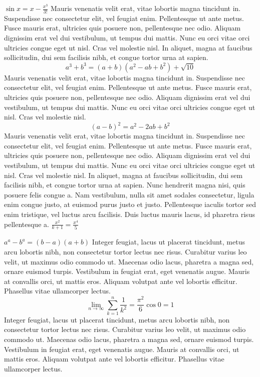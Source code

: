 \documentclass{article}
\begin{document}
\(
\sin x  =  x -\frac{x^{3}}{3!}
\)
Mauris venenatis velit erat, vitae lobortis magna tincidunt in. Suspendisse nec consectetur elit, vel feugiat enim. Pellentesque ut ante metus. Fusce mauris erat, ultricies quis posuere non, pellentesque nec odio. Aliquam dignissim erat vel dui vestibulum, ut tempus dui mattis. Nunc eu orci vitae orci ultricies congue eget ut nisl. Cras vel molestie nisl. In aliquet, magna at faucibus sollicitudin, dui sem facilisis nibh, et congue tortor urna at sapien.
\[ a^{3} + b^{3} = (a+b)(a^{2}-ab+b^{2}) + \sqrt{10} \]
Mauris venenatis velit erat, vitae lobortis magna tincidunt in. Suspendisse nec consectetur elit, vel feugiat enim. Pellentesque ut ante metus. Fusce mauris erat, ultricies quis posuere non, pellentesque nec odio. Aliquam dignissim erat vel dui vestibulum, ut tempus dui mattis. Nunc eu orci vitae orci ultricies congue eget ut nisl. Cras vel molestie nisl.
\begin{equation}
(a-b)^{2}=a^{2}-2ab+b^{2} 
\end{equation}
Mauris venenatis velit erat, vitae lobortis magna tincidunt in. Suspendisse nec consectetur elit, vel feugiat enim. Pellentesque ut ante metus. Fusce mauris erat, ultricies quis posuere non, pellentesque nec odio. Aliquam dignissim erat vel dui vestibulum, ut tempus dui mattis. Nunc eu orci vitae orci ultricies congue eget ut nisl. Cras vel molestie nisl. In aliquet, magna at faucibus sollicitudin, dui sem facilisis nibh, et congue tortor urna at sapien.
Nunc hendrerit magna nisi, quis posuere felis congue a. Nam vestibulum, nulla sit amet sodales consectetur, ligula enim congue justo, at euismod purus justo et justo. Pellentesque iaculis tortor sed enim tristique, vel luctus arcu facilisis. Duis luctus mauris lacus, id pharetra risus pellentesque a.
$\frac{ x^{2} }{ k+1 } = \frac{ x^{4} }{ 5 }$

\begin{math}
	a^{a}-b^{a} = (b - a)(a + b)
\end{math}
 Integer feugiat, lacus ut placerat tincidunt, metus arcu lobortis nibh, non consectetur tortor lectus nec risus. Curabitur varius leo velit, ut maximus odio commodo ut. Maecenas odio lacus, pharetra a magna sed, ornare euismod turpis. Vestibulum in feugiat erat, eget venenatis augue. Mauris at convallis orci, ut mattis eros. Aliquam volutpat ante vel lobortis efficitur. Phasellus vitae ullamcorper lectus.
$$
\lim_{n \to \infty}
\sum_{k=1}^n \frac{1}{k^2}
= \frac{\pi^2}{6} \cos{0} = 1
$$
 Integer feugiat, lacus ut placerat tincidunt, metus arcu lobortis nibh, non consectetur tortor lectus nec risus. Curabitur varius leo velit, ut maximus odio commodo ut. Maecenas odio lacus, pharetra a magna sed, ornare euismod turpis. Vestibulum in feugiat erat, eget venenatis augue. Mauris at convallis orci, ut mattis eros. Aliquam volutpat ante vel lobortis efficitur. Phasellus vitae ullamcorper lectus.
\end{document}
